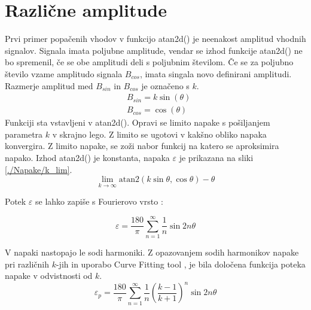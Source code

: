 \section{Različne amplitude}
Prvi primer popačenih vhodov v funkcijo atan2d() je neenakost amplitud vhodnih signalov. Signala imata poljubne amplitude, vendar se izhod funkcije atan2d() ne bo spremenil, če se obe amplitudi deli s
poljubnim številom. Če se za poljubno število vzame amplitudo signala $B_{cos}$, imata singala novo definirani amplitudi. Razmerje amplitud med $B_{sin}$ in $B_{cos}$ je označeno s $k$.
\begin{eqnarray}
\label{equ:def_sin_ama}
&B_{sin} = k \sin(\theta)\\
\label{equ:def_cos_amp}
&B_{cos} =\cos(\theta)
\end{eqnarray}
Funkciji sta vstavljeni v atan2d(). Opravi se limito napake s pošiljanjem parametra $k$ v skrajno lego. Z limito se ugotovi v kakšno obliko napaka konvergira. Z limito napake, se zoži nabor funkcij na katero se aproksimira napako.  Izhod atan2d() je konstanta, napaka $\varepsilon$ je prikazana na sliki \ref{./Napake/k_lim}.
\begin{equation}
\lim_{k \rightarrow \infty} \mathrm{atan2}(k \sin{\theta},\cos{\theta}) - \theta
\end{equation}

Potek $\varepsilon$ se lahko zapiše s Fourierovo vrsto \cite{Matematika1}:

\begin{equation}
\varepsilon = \frac{180}{\pi}\sum_{n=1}^{\infty}\frac{1}{n} \sin 2 n \theta
\end{equation}

V napaki nastopajo le sodi harmoniki. Z opazovanjem sodih harmonikov napake pri različnih $k$-jih in uporabo Curve Fitting tool \cite{cftool}, je bila določena funkcija poteka napake v odvistnosti od $k$.
\begin{equation}
\label{vrsta_k}
\varepsilon_p =\frac{180}{\pi}\sum_{n=1}^{\infty}\frac{1}{n}(\frac{k-1}{k+1})^n \sin 2 n \theta
\end{equation}

